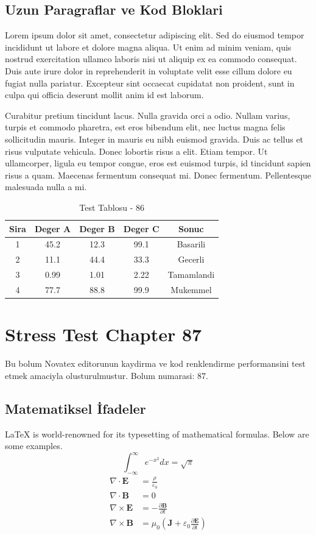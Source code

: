 \documentclass[12pt,a4paper]{article}
\begin{document}
\subsection{Uzun Paragraflar ve Kod Bloklari}
Lorem ipsum dolor sit amet, consectetur adipiscing elit. Sed do eiusmod tempor incididunt ut labore et dolore magna aliqua. Ut enim ad minim veniam, quis nostrud exercitation ullamco laboris nisi ut aliquip ex ea commodo consequat. Duis aute irure dolor in reprehenderit in voluptate velit esse cillum dolore eu fugiat nulla pariatur. Excepteur sint occaecat cupidatat non proident, sunt in culpa qui officia deserunt mollit anim id est laborum.

Curabitur pretium tincidunt lacus. Nulla gravida orci a odio. Nullam varius, turpis et commodo pharetra, est eros bibendum elit, nec luctus magna felis sollicitudin mauris. Integer in mauris eu nibh euismod gravida. Duis ac tellus et risus vulputate vehicula. Donec lobortis risus a elit. Etiam tempor. Ut ullamcorper, ligula eu tempor congue, eros est euismod turpis, id tincidunt sapien risus a quam. Maecenas fermentum consequat mi. Donec fermentum. Pellentesque malesuada nulla a mi.

\begin{table}[h!]
\centering
\begin{tabular}{|c|c|c|c|c|}
\hline
\textbf{Sira} & \textbf{Deger A} & \textbf{Deger B} & \textbf{Deger C} & \textbf{Sonuc} \\
\hline
1 & 45.2 & 12.3 & 99.1 & Basarili \\
2 & 11.1 & 44.4 & 33.3 & Gecerli \\
3 & 0.99 & 1.01 & 2.22 & Tamamlandi \\
4 & 77.7 & 88.8 & 99.9 & Mukemmel \\
\hline
\end{tabular}
\caption{Test Tablosu - 86}
\end{table}

\newpage
\section{Stress Test Chapter 87}
Bu bolum Novatex editorunun kaydirma ve kod renklendirme performansini test etmek amaciyla olusturulmustur. Bolum numarasi: 87.

\subsection{Matematiksel İfadeler}
\LaTeX{} is world-renowned for its typesetting of mathematical formulas. Below are some examples.
\begin{equation}
\int_{-\infty}^{\infty} e^{-x^2} dx = \sqrt{\pi}
\end{equation}
\begin{align}
\nabla \cdot \mathbf{E} &= \frac{\rho}{\varepsilon_0} \\
\nabla \cdot \mathbf{B} &= 0 \\
\nabla \times \mathbf{E} &= -\frac{\partial \mathbf{B}}{\partial t} \\
\nabla \times \mathbf{B} &= \mu_0\left(\mathbf{J} + \varepsilon_0 \frac{\partial \mathbf{E}}{\partial t}\right)
\end{align}
\end{document}
